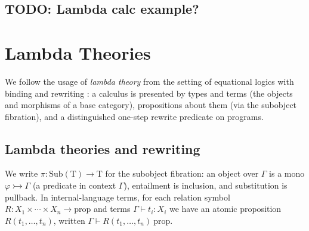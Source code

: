 \documentclass[11pt]{article}
\theoremstyle{definition}
\theoremstyle{plain}
\theoremstyle{remark}
\theoremstyle{plain}
\newcommand{\mrm}[1]{\mathrm{#1}}
\newcommand{\T}{\mrm{T}}
\begin{document}
\subsection{TODO: Lambda calc example?}


\section{Lambda Theories}
\label{sec:lambdatheories}

We follow the usage of \emph{lambda theory} from the setting of
equational logics with binding and rewriting \cite{TODO:whoever}: a calculus is presented by
types and terms (the objects and morphisms of a base category), propositions about them (via the subobject
fibration), and a distinguished one-step rewrite predicate on programs.

\subsection{Lambda theories and rewriting}

We write $\pi:\mrm{Sub}(\T)\to \T$ for the subobject fibration\cite{Jacobs1999,Johnstone2002,LambekScott1988}: an object over $\Gamma$
is a mono $\varphi\rightarrowtail \Gamma$ (a predicate in context $\Gamma$), entailment is inclusion,
and substitution is pullback. In internal-language terms, for each relation symbol $R:X_1\times\cdots\times X_n\to\mrm{prop}$ and terms $\Gamma\vdash t_i:X_i$ we have an atomic proposition $R(t_1,\dots,t_n)$, written $\Gamma\vdash R(t_1,\dots,t_n)\ \mrm{prop}$.
\end{document}
